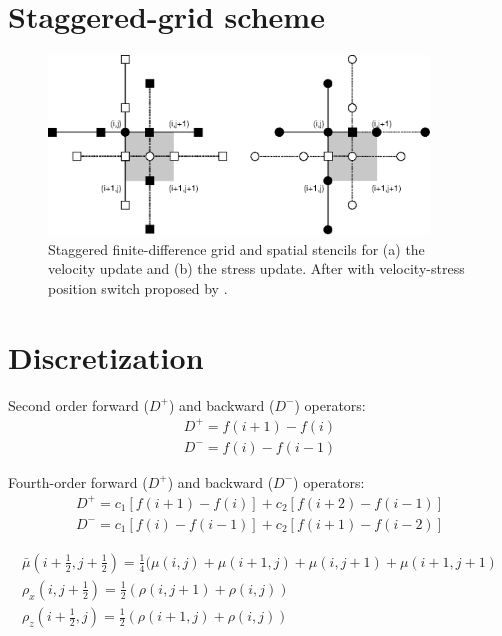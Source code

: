 \documentclass{gnulike}
\begin{document}
\section{Staggered-grid scheme}

\cite{virieux1986psv,levander1988fourth,bohlen2006accuracy}

\begin{figure}[!ht]
  \centering
  \includegraphics[width=0.9\textwidth]{fig/staggered.eps}
  \caption{Staggered finite-difference grid and spatial stencils for (a) the velocity update and (b) the stress update. After \cite{levander1988fourth} with velocity-stress position switch proposed by \cite{bohlen2006accuracy}.}
  \label{fig:staggered-grid}
\end{figure}

\section{Discretization}

\noindent Second order forward ($D^{+}$) and backward ($D^{-}$) operators:
\begin{eqnarray}
  D^{+}=f(i+1)-f(i) \nonumber \\
  D^{-}=f(i)-f(i-1)
\end{eqnarray}

\noindent Fourth-order forward ($D^{+}$) and backward ($D^{-}$) operators:
\begin{eqnarray}
  D^{+}=c_{1}[f(i+1)-f(i)]+c_{2}[f(i+2)-f(i-1)] \nonumber \\
  D^{-}=c_{1}[f(i)-f(i-1)]+c_{2}[f(i+1)-f(i-2)]
\end{eqnarray}


\begin{eqnarray}
  \bar{\mu}(i+\frac{1}{2}, j+\frac{1}{2})=\frac{1}{4}(\mu(i,j)+\mu(i+1,j)+\mu(i,j+1)+\mu(i+1,j+1) \\
  \rho_{x}(i,j+\frac{1}{2}) = \frac{1}{2}(\rho (i,j+1)+\rho(i,j)) \\
  \rho_{z}(i+\frac{1}{2},j) = \frac{1}{2}(\rho (i+1,j)+\rho(i,j))
\end{eqnarray}
\end{document}
